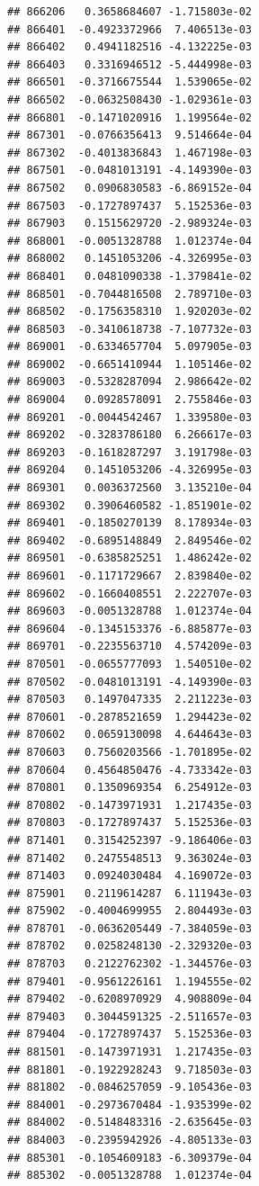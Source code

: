 \begin{frame}[fragile]
\begin{verbatim}
## 866206   0.3658684607 -1.715803e-02
## 866401  -0.4923372966  7.406513e-03
## 866402   0.4941182516 -4.132225e-03
## 866403   0.3316946512 -5.444998e-03
## 866501  -0.3716675544  1.539065e-02
## 866502  -0.0632508430 -1.029361e-03
## 866801  -0.1471020916  1.199564e-02
## 867301  -0.0766356413  9.514664e-04
## 867302  -0.4013836843  1.467198e-03
## 867501  -0.0481013191 -4.149390e-03
## 867502   0.0906830583 -6.869152e-04
## 867503  -0.1727897437  5.152536e-03
## 867903   0.1515629720 -2.989324e-03
## 868001  -0.0051328788  1.012374e-04
## 868002   0.1451053206 -4.326995e-03
## 868401   0.0481090338 -1.379841e-02
## 868501  -0.7044816508  2.789710e-03
## 868502  -0.1756358310  1.920203e-02
## 868503  -0.3410618738 -7.107732e-03
## 869001  -0.6334657704  5.097905e-03
## 869002  -0.6651410944  1.105146e-02
## 869003  -0.5328287094  2.986642e-02
## 869004   0.0928578091  2.755846e-03
## 869201  -0.0044542467  1.339580e-03
## 869202  -0.3283786180  6.266617e-03
## 869203  -0.1618287297  3.191798e-03
## 869204   0.1451053206 -4.326995e-03
## 869301   0.0036372560  3.135210e-04
## 869302   0.3906460582 -1.851901e-02
## 869401  -0.1850270139  8.178934e-03
## 869402  -0.6895148849  2.849546e-02
## 869501  -0.6385825251  1.486242e-02
## 869601  -0.1171729667  2.839840e-02
## 869602  -0.1660408551  2.222707e-03
## 869603  -0.0051328788  1.012374e-04
## 869604  -0.1345153376 -6.885877e-03
## 869701  -0.2235563710  4.574209e-03
## 870501  -0.0655777093  1.540510e-02
## 870502  -0.0481013191 -4.149390e-03
## 870503   0.1497047335  2.211223e-03
## 870601  -0.2878521659  1.294423e-02
## 870602   0.0659130098  4.644643e-03
## 870603   0.7560203566 -1.701895e-02
## 870604   0.4564850476 -4.733342e-03
## 870801   0.1350969354  6.254912e-03
## 870802  -0.1473971931  1.217435e-03
## 870803  -0.1727897437  5.152536e-03
## 871401   0.3154252397 -9.186406e-03
## 871402   0.2475548513  9.363024e-03
## 871403   0.0924030484  4.169072e-03
## 875901   0.2119614287  6.111943e-03
## 875902  -0.4004699955  2.804493e-03
## 878701  -0.0636205449 -7.384059e-03
## 878702   0.0258248130 -2.329320e-03
## 878703   0.2122762302 -1.344576e-03
## 879401  -0.9561226161  1.194555e-02
## 879402  -0.6208970929  4.908809e-04
## 879403   0.3044591325 -2.511657e-03
## 879404  -0.1727897437  5.152536e-03
## 881501  -0.1473971931  1.217435e-03
## 881801  -0.1922928243  9.718503e-03
## 881802  -0.0846257059 -9.105436e-03
## 884001  -0.2973670484 -1.935399e-02
## 884002  -0.5148483316 -2.635645e-03
## 884003  -0.2395942926 -4.805133e-03
## 885301  -0.1054609183 -6.309379e-04
## 885302  -0.0051328788  1.012374e-04

\end{verbatim}
\end{frame}
